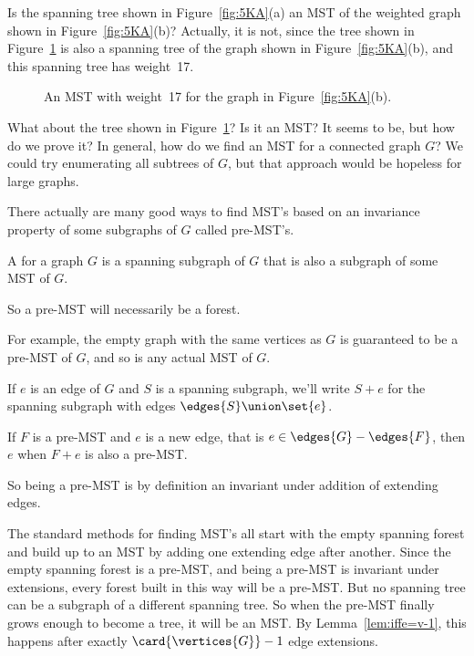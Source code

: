 Is the spanning tree shown in Figure~\ref{fig:5KA}(a) an MST of the
weighted graph shown in Figure~\ref{fig:5KA}(b)?  Actually, it is not,
since the tree shown in Figure~\ref{fig:5KB} is also a spanning tree
of the graph shown in Figure~\ref{fig:5KA}(b), and this spanning tree
has weight~17.

\begin{figure}


\caption{An MST with weight~17 for the graph in
  Figure~\ref{fig:5KA}(b).}
\label{fig:5KB}

\end{figure}

What about the tree shown in Figure~\ref{fig:5KB}?  Is it an MST?  It
seems to be, but how do we prove it?  In general, how do we find an
MST for a connected graph $G$?  We could try enumerating all subtrees
of $G$, but that approach would be hopeless for large graphs.

\begin{editingnotes}
\end{editingnotes}
There actually are many good ways to find MST's based on an invariance
property of some subgraphs of $G$ called pre-MST's.

\begin{definition}
A  for a graph $G$ is a spanning
subgraph of $G$ that is also a subgraph of some MST of $G$.
\end{definition}
So a pre-MST will necessarily be a forest.

For example, the empty graph with the same vertices as $G$ is guaranteed
to be a pre-MST of $G$, and so is any actual MST of $G$.

 \iffalse In the rest of this section, subgraphs and forests will
 always be spanning forests and spanning subgraphs of $G$, that is
 they will have the same vertices as $G$.\fi

If $e$ is an edge of $G$ and $S$ is a spanning subgraph, we'll write
$S+e$ for the spanning subgraph with edges $\edges{S} \union \set{e}$.
\begin{definition}
If $F$ is a pre-MST and $e$ is a new edge, that is $e \in
\edges{G}-\edges{F}$, then $e$  when $F+e$ is also a
pre-MST.
\end{definition}
So being a pre-MST is by definition an invariant under addition of
extending edges.

The standard methods for finding MST's all start with the empty
spanning forest and build up to an MST by adding one extending edge
after another.  Since the empty spanning forest is a pre-MST, and
being a pre-MST is invariant under extensions, every forest built in
this way will be a pre-MST.  But no spanning tree can be a subgraph of
a different spanning tree.  So when the pre-MST finally grows enough
to become a tree, it will be an MST.  By Lemma~\ref{lem:iffe=v-1}, this
happens after exactly $\card{\vertices{G}}-1$ edge extensions.

